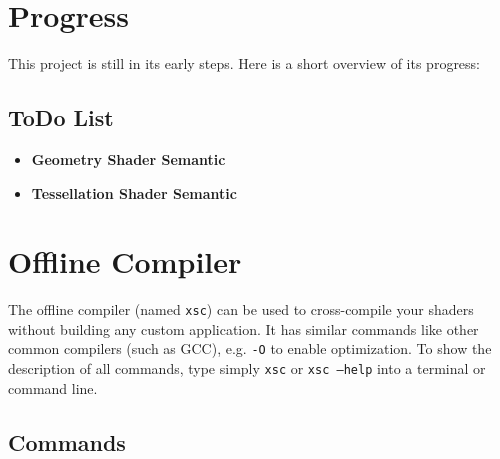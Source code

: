 \documentclass{article}
\begin{document}

\newpage
\section{Progress}

This project is still in its early steps. Here is a short overview of its progress:

\subsection{ToDo List}
\begin{itemize}
	\item \textbf{Geometry Shader Semantic}
	\item \textbf{Tessellation Shader Semantic}
\end{itemize}



\newpage
\section{Offline Compiler}

The offline compiler (named \texttt{xsc}) can be used to cross-compile your shaders without building any custom application.
It has similar commands like other common compilers (such as GCC), e.g. \texttt{-O} to enable optimization.
To show the description of all commands, type simply \texttt{xsc} or \texttt{xsc --help} into a terminal or command line.

\subsection{Commands}
\end{document}
